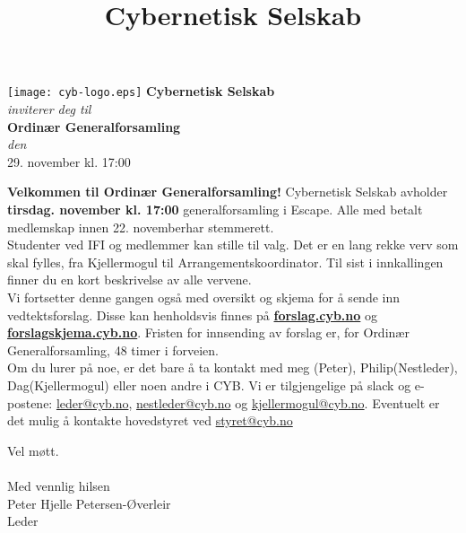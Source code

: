 \documentclass[12pt, norsk, a4paper]{proc}
\title{Cybernetisk Selskab}
\newcommand{\genforsDato}{29. november  kl. 17:00} %
\newcommand{\genforsDag}{tirsdag} %
\newcommand{\genforsDatoUkeFoer}{22. november} %
\newcommand{\generalforsamling}{Ordinær Generalforsamling} %
\newcommand{\leder}{Peter} %
\newcommand{\nestlederFornavn}{Philip} %
\newcommand{\nestlederFulltNavn}{Philip Høeg Eriksen} %
\newcommand{\mogul}{Dag} %
\begin{document}
   \begin{strip}
       \begin{center}
           \texttt{[image: cyb-logo.eps]}
            \Large\textbf{Cybernetisk Selskab}\\
            \textit{inviterer deg til}\\
            \large\textbf{\generalforsamling} \\
            \emph{den} \\
            \large \genforsDato \\
       \end{center}
   \end{strip}

\textbf{Velkommen til \generalforsamling!}
Cybernetisk Selskab avholder \textbf{\genforsDag \space \genforsDato} generalforsamling i Escape. Alle med betalt medlemskap innen \genforsDatoUkeFoer \space har stemmerett.\\

Studenter ved IFI og medlemmer kan stille til valg. Det er en lang rekke verv
som skal fylles, fra
Kjellermogul
til
Arrangementskoordinator.
Til
sist i innkallingen finner du en kort beskrivelse av alle vervene.\\

Vi fortsetter denne gangen også med oversikt og skjema for å sende inn vedtektsforslag. Disse kan henholdsvis finnes på \textbf{\href{http://forslag.cyb.no/}{forslag.cyb.no}} og \textbf{\href{http://forslagskjema.cyb.no/}{forslagskjema.cyb.no}}. Fristen for innsending av forslag er,  for \generalforsamling, 48 timer i forveien. \\

Om du lurer på noe, er det bare å ta kontakt med
meg (\leder), \nestlederFornavn \space (Nestleder), \mogul \space (Kjellermogul) eller noen andre i CYB. Vi er tilgjengelige på
slack og e-postene: \href{mailto:leder@cyb.no}{leder@cyb.no}, \href{mailto:nestleder@cyb.no}{nestleder@cyb.no} og
\href{mailto:kjellermogul@cyb.no}{kjellermogul@cyb.no}. Eventuelt er det mulig å kontakte hovedstyret ved \href{mailto:styret@cyb.no}{styret@cyb.no}

Vel møtt.\\\\
Med vennlig hilsen\\
Peter Hjelle Petersen-Øverleir\\
Leder
\end{document}
